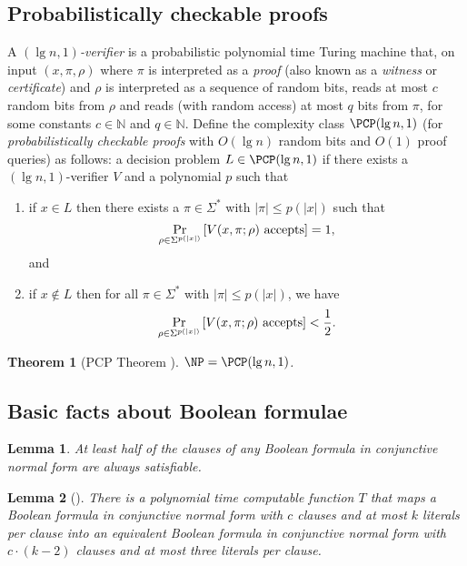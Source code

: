 \documentclass[]{article}
\theoremstyle{plain}
\newtheorem{theorem}{Theorem}
\newtheorem{lemma}{Lemma}
\theoremstyle{definition}
\begin{document}
\subsection{Probabilistically checkable proofs}

A \emph{$(\lg n, 1)$-verifier} is a probabilistic polynomial time Turing machine that, on input $(x, \pi, \rho)$ where $\pi$ is interpreted as a \emph{proof} (also known as a \emph{witness} or \emph{certificate}) and $\rho$ is interpreted as a sequence of random bits, reads at most $c$ random bits from $\rho$ and reads (with random access) at most $q$ bits from $\pi$, for some constants $c \in \mathbb{N}$ and $q \in \mathbb{N}$.
Define the complexity class $\PCP(\lg n, 1)$ (for \emph{probabilistically checkable proofs} with $O(\lg n)$ random bits and $O(1)$ proof queries) as follows: a decision problem $L \in \PCP(\lg n, 1)$ if there exists a $(\lg n, 1)$-verifier $V$ and a polynomial $p$ such that
\begin{enumerate}
\item
  if $x \in L$ then there exists a $\pi \in \Sigma^*$ with $|\pi| \leq p(|x|)$ such that
  \begin{displaymath}
    \Pr_{\rho \in \Sigma^{p(|x|)}}\left[V(x, \pi; \rho) \textnormal{ accepts}\right] = 1,
  \end{displaymath}
  and
\item
  if $x \notin L$ then for all $\pi \in \Sigma^*$ with $|\pi| \leq p(|x|)$, we have
  \begin{displaymath}
    \Pr_{\rho \in \Sigma^{p(|x|)}}\left[V(x, \pi; \rho) \textnormal{ accepts}\right] < \frac{1}{2}.
  \end{displaymath}
\end{enumerate}

\begin{theorem}[PCP Theorem \cite{pcp}]\label{thm:pcp}
  $\NP = \PCP(\lg n, 1)$.
\end{theorem}

\subsection{Basic facts about Boolean formulae}

\begin{lemma}\label{lem:half}
 At least half of the clauses of any Boolean formula in conjunctive normal form are always satisfiable.
\end{lemma}

\begin{lemma}[{\cite[Example~6.5]{book}}]\label{lem:three}
  There is a polynomial time computable function $T$ that maps a Boolean formula in conjunctive normal form with $c$ clauses and at most $k$ literals per clause into an equivalent Boolean formula in conjunctive normal form with $c \cdot (k - 2)$ clauses and at most three literals per clause.
\end{lemma}
\end{document}
